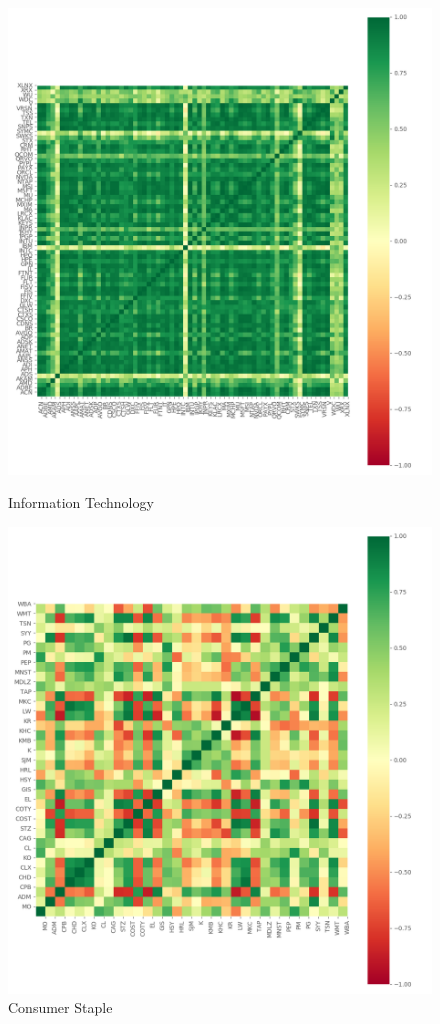 \documentclass{article}
\begin{document}
    \begin{figure}[H]
        \begin{minipage}[t]{0.45\textwidth}
            \centering
            \includegraphics[width = 0.95\linewidth]{./3.png}
            \caption{Information Technology}
            \label{fig2}
        \end{minipage}
        \begin{minipage}[t]{0.45\textwidth}
            \centering
            \includegraphics[width = 0.95\linewidth]{./2.png}
            \caption{Consumer Staple}
            \label{fig3}
        \end{minipage}
    \end{figure}
\end{document}
